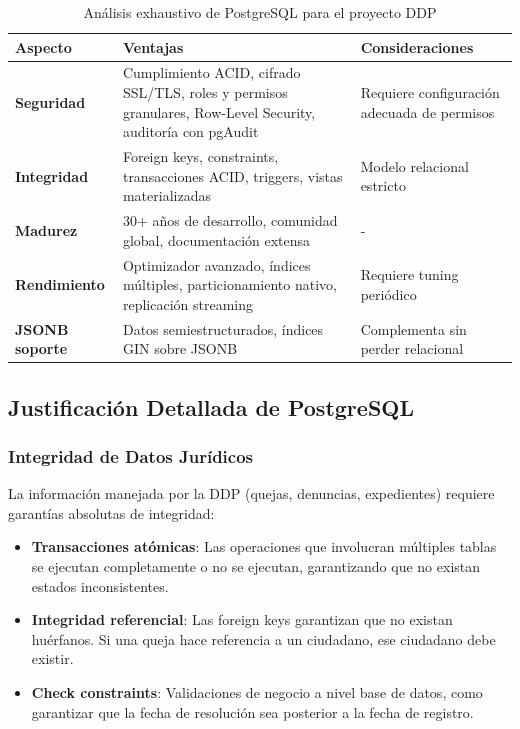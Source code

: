 \begin{table}[htbp]
\centering
\caption{Análisis exhaustivo de PostgreSQL para el proyecto DDP}
\label{tab:postgresql-analisis}
\small
\begin{tabular}{|p{3cm}|p{4.5cm}|p{3.8cm}|}
\hline
\textbf{Aspecto} & \textbf{Ventajas} & \textbf{Consideraciones} \\
\hline
\textbf{Seguridad} & Cumplimiento ACID, cifrado SSL/TLS, roles y permisos granulares, Row-Level Security, auditoría con pgAudit & Requiere configuración adecuada de permisos \\
\hline
\textbf{Integridad} & Foreign keys, constraints, transacciones ACID, triggers, vistas materializadas & Modelo relacional estricto \\
\hline
\textbf{Madurez} & 30+ años de desarrollo, comunidad global, documentación extensa & - \\
\hline
\textbf{Rendimiento} & Optimizador avanzado, índices múltiples, particionamiento nativo, replicación streaming & Requiere tuning periódico \\
\hline
\textbf{JSONB soporte} & Datos semiestructurados, índices GIN sobre JSONB & Complementa sin perder relacional \\
\hline
\end{tabular}
\end{table}

\subsection{Justificación Detallada de PostgreSQL}

\subsubsection{Integridad de Datos Jurídicos}

La información manejada por la DDP (quejas, denuncias, expedientes) requiere garantías absolutas de integridad:

\begin{itemize}
    \item \textbf{Transacciones atómicas}: Las operaciones que involucran múltiples tablas se ejecutan completamente o no se ejecutan, garantizando que no existan estados inconsistentes.
    
    \item \textbf{Integridad referencial}: Las foreign keys garantizan que no existan huérfanos. Si una queja hace referencia a un ciudadano, ese ciudadano debe existir.
    
    \item \textbf{Check constraints}: Validaciones de negocio a nivel base de datos, como garantizar que la fecha de resolución sea posterior a la fecha de registro.
\end{itemize}

